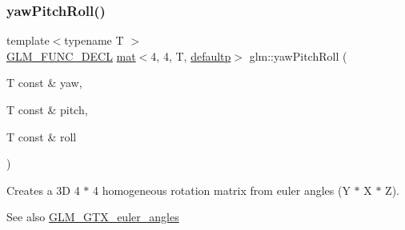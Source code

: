 \subsubsection{\texorpdfstring{yaw\+Pitch\+Roll()}{yawPitchRoll()}}
{\footnotesize\ttfamily template$<$typename T $>$ \\
\mbox{\hyperlink{setup_8hpp_ab2d052de21a70539923e9bcbf6e83a51}{G\+L\+M\+\_\+\+F\+U\+N\+C\+\_\+\+D\+E\+CL}} \mbox{\hyperlink{structglm_1_1mat}{mat}}$<$4, 4, T, \mbox{\hyperlink{namespaceglm_a36ed105b07c7746804d7fdc7cc90ff25a9d21ccd8b5a009ec7eb7677befc3bf51}{defaultp}}$>$ glm\+::yaw\+Pitch\+Roll (\begin{DoxyParamCaption}\item[{T const \&}]{yaw,  }\item[{T const \&}]{pitch,  }\item[{T const \&}]{roll }\end{DoxyParamCaption})}

Creates a 3D 4 $\ast$ 4 homogeneous rotation matrix from euler angles (Y $\ast$ X $\ast$ Z). \begin{DoxySeeAlso}{See also}
\mbox{\hyperlink{group__gtx__euler__angles}{G\+L\+M\+\_\+\+G\+T\+X\+\_\+euler\+\_\+angles}} 
\end{DoxySeeAlso}

